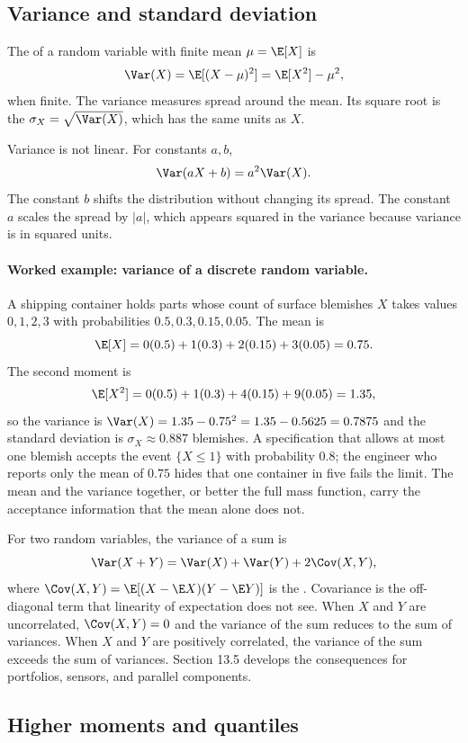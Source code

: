 \subsection{Variance and standard deviation}

The  of a random variable with finite mean
$\mu = \E[X]$ is
\[
\Var(X) = \E[(X - \mu)^{2}] = \E[X^{2}] - \mu^{2},
\]
when finite. The variance measures spread around the mean. Its
square root is the  $\sigma_{X} =
\sqrt{\Var(X)}$, which has the same units as $X$.

Variance is not linear. For constants $a, b$,
\[
\Var(aX + b) = a^{2} \Var(X).
\]
The constant $b$ shifts the distribution without changing its
spread. The constant $a$ scales the spread by $|a|$, which appears
squared in the variance because variance is in squared units.

\paragraph{Worked example: variance of a discrete random variable.}
A shipping container holds parts whose count of surface blemishes
$X$ takes values $0, 1, 2, 3$ with probabilities $0.5, 0.3, 0.15,
0.05$. The mean is
\[
\E[X] = 0(0.5) + 1(0.3) + 2(0.15) + 3(0.05) = 0.75.
\]
The second moment is
\[
\E[X^{2}] = 0(0.5) + 1(0.3) + 4(0.15) + 9(0.05) = 1.35,
\]
so the variance is $\Var(X) = 1.35 - 0.75^{2} = 1.35 - 0.5625 =
0.7875$ and the standard deviation is $\sigma_{X} \approx 0.887$
blemishes. A specification that allows at most one blemish accepts
the event $\{X \leq 1\}$ with probability $0.8$; the engineer who
reports only the mean of $0.75$ hides that one container in five
fails the limit. The mean and the variance together, or better the
full mass function, carry the acceptance information that the mean
alone does not.

For two random variables, the variance of a sum is
\[
\Var(X + Y) = \Var(X) + \Var(Y) + 2\Cov(X, Y),
\]
where $\Cov(X, Y) = \E[(X - \E X)(Y - \E Y)]$ is the
. Covariance is the off-diagonal term that
linearity of expectation does not see. When $X$ and $Y$ are
uncorrelated, $\Cov(X, Y) = 0$ and the variance of the sum reduces
to the sum of variances. When $X$ and $Y$ are positively
correlated, the variance of the sum exceeds the sum of variances.
Section 13.5 develops the consequences for portfolios, sensors, and
parallel components.

\subsection{Higher moments and quantiles}

